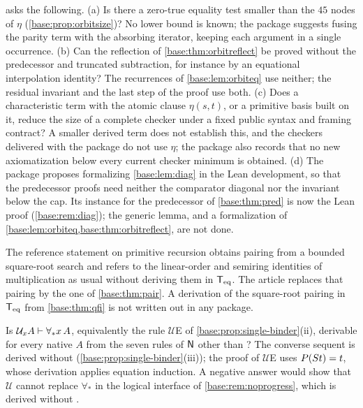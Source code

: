\begin{question}
\label{base:q:orbiteq}
 asks the following.  (a) Is there a zero-true
equality test smaller than the $45$ nodes of $\eta$
(\cref{base:prop:orbitsize})?  No lower bound is known; the package
suggests fusing the parity term with the absorbing iterator, keeping each
argument in a single occurrence.  (b) Can the reflection of
\cref{base:thm:orbitreflect} be proved without the predecessor and truncated
subtraction, for instance by an equational interpolation identity?  The
recurrences of \cref{base:lem:orbiteq} use neither; the residual invariant
and the last step of the proof use both.  (c) Does a characteristic term
with the atomic clause $\eta(s,t)$, or a primitive basis built on it, reduce
the size of a complete checker under a fixed public syntax and framing
contract?  A smaller derived term does not establish this, and the checkers
delivered with the package do not use $\eta$; the package also records that
no new axiomatization below every current checker minimum is obtained.
(d) The package proposes formalizing \cref{base:lem:diag} in the Lean
development, so that the predecessor proofs need neither the comparator
diagonal nor the invariant below the cap.  Its instance for the predecessor
of \cref{base:thm:pred} is now the Lean proof (\cref{base:rem:diag}); the
generic lemma, and a formalization of
\cref{base:lem:orbiteq,base:thm:orbitreflect}, are not done.
\end{question}

\begin{question}
\label{base:q:sqrt}
The reference statement on primitive recursion obtains pairing from a
bounded square-root search and refers to the linear-order and semiring
identities of multiplication as usual without deriving them in $\mathsf{T}_{\mathrm{eq}}$.  The
article replaces that pairing by the one of \cref{base:thm:pair}.  A
derivation of the square-root pairing in $\mathsf{T}_{\mathrm{eq}}$ from \cref{base:thm:qfi} is
not written out in any package.
\end{question}

\begin{question}
\label{base:q:single-binder-noprogress}
Is $\mathcal U_xA\vdash\forall_* x\,A$, equivalently the rule
$\mathcal U$E of \cref{base:prop:single-binder}(ii), derivable for every
native $A$ from the seven rules of $\mathsf{N}$ other than ?  The
converse sequent is derived without 
(\cref{base:prop:single-binder}(iii)); the proof of
$\mathcal U$E uses $P(S t)=t$, whose derivation applies equation
induction.  A negative answer would show that $\mathcal U$ cannot replace
$\forall_*$ in the logical interface of \cref{base:rem:noprogress}, which
is derived without .
\end{question}

